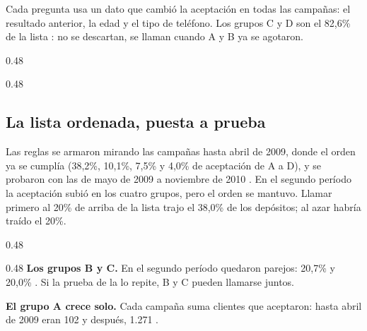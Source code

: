 \documentclass[10pt,a4paper]{article}
\begin{document}
Cada pregunta usa un dato que cambió la aceptación en todas las campañas: el resultado
anterior, la edad y el tipo de teléfono. Los grupos C y D son el 82,6\% de la lista
: no se descartan, se llaman cuando A y B ya se agotaron.

\noindent\begin{columna}{0.48\linewidth}
\end{columna}\hfill
\begin{columna}{0.48\linewidth}
\end{columna}

\subsection{La lista ordenada, puesta a prueba}

Las reglas se armaron mirando las campañas hasta abril de 2009, donde el orden ya se
cumplía (38,2\%, 10,1\%, 7,5\% y 4,0\% de aceptación de A a D), y se probaron con las de
mayo de 2009 a noviembre de 2010 . En el segundo período la aceptación subió
en los cuatro grupos, pero el orden se mantuvo. Llamar primero al 20\% de arriba de la
lista trajo el 38,0\% de los depósitos; al azar habría traído el 20\%.

\noindent\begin{columna}{0.48\linewidth}
\end{columna}\hfill
\begin{columna}{0.48\linewidth}
\textbf{Los grupos B y C.} En el segundo período quedaron parejos: 20,7\% y 20,0\%
. Si la prueba de la  lo repite, B y C pueden
llamarse juntos.

\textbf{El grupo A crece solo.} Cada campaña suma clientes que aceptaron: hasta abril de
2009 eran 102 y después, 1.271 .
\end{columna}
\end{document}
